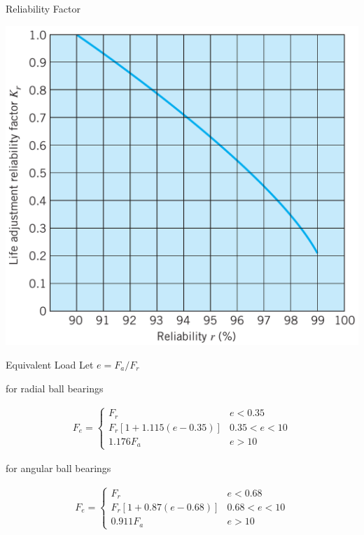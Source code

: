 \documentclass[10pt, svgnames]{beamer}
\begin{document}
\begin{frame}[label={sec:orgebf3b12}]{Reliability Factor}
\begin{center}
\includegraphics[width=.9\linewidth]{./pictures/reliability-factor.png}
\end{center}
\end{frame}

\begin{frame}[label={sec:orgd365cbb}]{Equivalent Load}
Let \(e = F_a / F_r\)

for radial ball bearings

\begin{align*}
    F_e = \left\{
    \begin{array}{ll}
        F_r & e < 0.35 \\
        F_r \left[ 1 + 1.115(e - 0.35) \right] & 0.35 < e < 10 \\
        1.176 F_a & e > 10
    \end{array}
    \right.
\end{align*}

for angular ball bearings

\begin{align*}
    F_e = \left\{
    \begin{array}{ll}
        F_r & e < 0.68 \\
        F_r \left[ 1 + 0.87(e - 0.68) \right] & 0.68 < e < 10 \\
        0.911 F_a & e > 10
    \end{array}
    \right.
\end{align*}
\end{frame}
\end{document}
